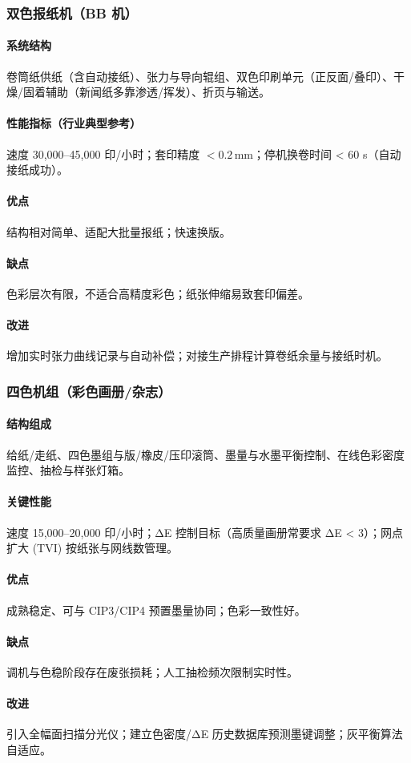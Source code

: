 \subsubsection{双色报纸机（BB 机）}
\paragraph{系统结构} 卷筒纸供纸（含自动接纸）、张力与导向辊组、双色印刷单元（正反面/叠印）、干燥/固着辅助（新闻纸多靠渗透/挥发）、折页与输送。\paragraph{性能指标（行业典型参考）} 速度 30{,}000--45{,}000 印/小时；套印精度 \(<0.2\,\text{mm}\)；停机换卷时间 < 60 s（自动接纸成功）。\paragraph{优点} 结构相对简单、适配大批量报纸；快速换版。\paragraph{缺点} 色彩层次有限，不适合高精度彩色；纸张伸缩易致套印偏差。\paragraph{改进} 增加实时张力曲线记录与自动补偿；对接生产排程计算卷纸余量与接纸时机。

\subsubsection{四色机组（彩色画册/杂志）}
\paragraph{结构组成} 给纸/走纸、四色墨组与版/橡皮/压印滚筒、墨量与水墨平衡控制、在线色彩密度监控、抽检与样张灯箱。\paragraph{关键性能} 速度 15{,}000--20{,}000 印/小时；ΔE 控制目标（高质量画册常要求 ΔE < 3）；网点扩大 (TVI) 按纸张与网线数管理。\paragraph{优点} 成熟稳定、可与 CIP3/CIP4 预置墨量协同；色彩一致性好。\paragraph{缺点} 调机与色稳阶段存在废张损耗；人工抽检频次限制实时性。\paragraph{改进} 引入全幅面扫描分光仪；建立色密度/ΔE 历史数据库预测墨键调整；灰平衡算法自适应。

